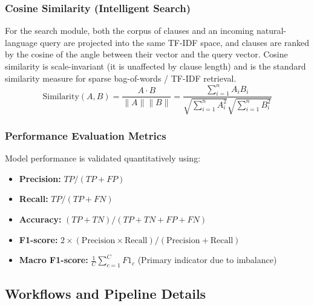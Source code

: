 \documentclass[12pt, a4paper]{report}
\begin{document}
\subsubsection{Cosine Similarity (Intelligent Search)}
For the search module, both the corpus of clauses and an incoming natural-language query are projected into the same TF-IDF space, and clauses are ranked by the cosine of the angle between their vector and the query vector. Cosine similarity is scale-invariant (it is unaffected by clause length) and is the standard similarity measure for sparse bag-of-words / TF-IDF retrieval.
\begin{equation}
    \text{Similarity}(A, B) = \frac{A \cdot B}{\|A\| \|B\|} = \frac{\sum_{i=1}^n A_i B_i}{\sqrt{\sum_{i=1}^n A_i^2} \sqrt{\sum_{i=1}^n B_i^2}}
\end{equation}

\subsubsection{Performance Evaluation Metrics}
Model performance is validated quantitatively using:
\begin{itemize}
    \item \textbf{Precision:} $TP / (TP + FP)$
    \item \textbf{Recall:} $TP / (TP + FN)$
    \item \textbf{Accuracy:} $(TP + TN) / (TP + TN + FP + FN)$
    \item \textbf{F1-score:} $2 \times (\text{Precision} \times \text{Recall}) / (\text{Precision} + \text{Recall})$
    \item \textbf{Macro F1-score:} $\frac{1}{C} \sum_{c=1}^{C} F1_c$ (Primary indicator due to imbalance)
\end{itemize}

\subsection{Workflows and Pipeline Details}
\end{document}
